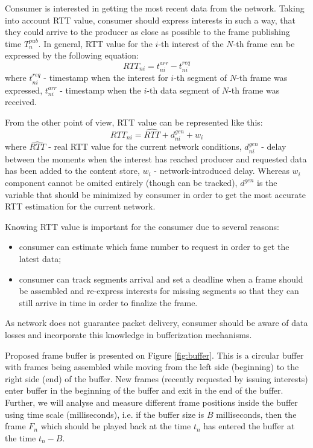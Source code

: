 \documentclass[10pt]{proc}
\begin{document}
Consumer is interested in getting the most recent data from the network. Taking into account RTT value, consumer should express interests in such a way, that they could arrive to the producer as close as possible to the frame publishing time $T^{pub}_{n}$. In general, RTT value for the $i$-th interest of the $N$-th frame can be expressed by the following equation:
\begin{equation}
RTT_{ni} = t^{arr}_{ni} - t^{req}_{ni}
\end{equation}
where $t^{req}_{ni}$ - timestamp when the interest for $i$-th segment of $N$-th frame was expressed, $t^{arr}_{ni}$ - timestamp when the $i$-th data segment of $N$-th frame was received.

From the other point of view, RTT value can be represented like this:
\begin{equation}
RTT_{ni} = \widehat{RTT} + d^{gen}_{ni} + w_i
\end{equation}
where $\widehat{RTT}$ - real RTT value for the current network conditions, $d^{gen}_{ni}$ - delay between the moments when the interest has reached producer and requested data has been added to the content store, $w_i$ - network-introduced delay.
Whereas $w_i$ component cannot be omited entirely (though can be tracked), $d^{gen}$ is the variable that should be minimized by consumer in order to get the most accurate RTT estimation for the current network. 

Knowing RTT value is important for the consumer due to several reasons:

\begin{itemize}
\item consumer can estimate which fame number to request in order to get the latest data;
\item consumer can track segments arrival and set a deadline when a frame should be assembled and re-express interests for missing segments so that they can still arrive in time in order to finalize the frame.
\end{itemize} 

As network does not guarantee packet delivery, consumer should be aware of data losses and incorporate this knowledge in bufferization mechanisms. 

Proposed frame buffer is presented on Figure \ref{fig:buffer}. This is a circular buffer with frames being assembled while moving from the left side (beginning) to the right side (end) of the buffer. New frames (recently requested by issuing interests) enter buffer in the beginning of the buffer and exit in the end of the buffer. Further, we will analyse and measure different frame positions inside the buffer using time scale (milliseconds), i.e. if the buffer size is $B$ milliseconds, then the frame $F_n$ which should be played back at the time $t_n$ has entered the buffer at the time $t_n-B$.
\end{document}

